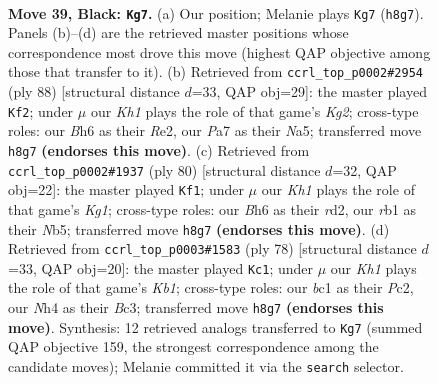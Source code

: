 \documentclass[11pt]{article}
\begin{document}
\clearpage

\begin{figure}[p]\centering
\begin{subfigure}{0.46\textwidth}\centering
\resizebox{\linewidth}{!}{%
\newchessgame
\chessboard[
  setfen={3r3k/p4B2/Pp5b/5p2/4pP1n/8/5K2/1RB5 b - - 11 39},
  showmover=false,
  pgfstyle=straightmove, color=movearrow, markmove={h8-g7}
]}
\caption{}
\end{subfigure}\hfill
\begin{subfigure}{0.46\textwidth}\centering
\resizebox{\linewidth}{!}{%
\newchessgame
\chessboard[
  setfen={8/4k3/4p1p1/N7/6P1/2r2P2/P3R1K1/2b5 w - - 1 45},
  showmover=false,
  pgfstyle=straightmove, color=movearrow, markmove={g2-f2}
]}
\caption{}
\end{subfigure}
\\[4pt]
\begin{subfigure}{0.46\textwidth}\centering
\resizebox{\linewidth}{!}{%
\newchessgame
\chessboard[
  setfen={5k2/6p1/7p/pN1b4/P6P/6P1/3r1P2/R5K1 w - - 0 41},
  showmover=false,
  pgfstyle=straightmove, color=movearrow, markmove={g1-f1}
]}
\caption{}
\end{subfigure}\hfill
\begin{subfigure}{0.46\textwidth}\centering
\resizebox{\linewidth}{!}{%
\newchessgame
\chessboard[
  setfen={1r3b2/5p1k/3p4/5pPp/7P/1PB5/2P5/1K2R3 w - - 2 40},
  showmover=false,
  pgfstyle=straightmove, color=movearrow, markmove={b1-c1}
]}
\caption{}
\end{subfigure}
\caption{\textbf{Move 39, Black: \texttt{Kg7}.} (a) Our position; Melanie plays \texttt{Kg7} (\texttt{h8g7}). Panels (b)--(d) are the retrieved master positions whose correspondence most drove this move (highest QAP objective among those that transfer to it). (b) Retrieved from \texttt{ccrl\_top\_p0002\#2954} (ply 88) [structural distance $d$=33, QAP obj=29]: the master played \texttt{Kf2}; under $\mu$ our \emph{Kh1} plays the role of that game's \emph{Kg2}; cross-type roles: our \emph{B}h6 as their \emph{R}e2, our \emph{P}a7 as their \emph{N}a5; transferred move \texttt{h8g7} \textbf{(endorses this move)}. (c) Retrieved from \texttt{ccrl\_top\_p0002\#1937} (ply 80) [structural distance $d$=32, QAP obj=22]: the master played \texttt{Kf1}; under $\mu$ our \emph{Kh1} plays the role of that game's \emph{Kg1}; cross-type roles: our \emph{B}h6 as their \emph{r}d2, our \emph{r}b1 as their \emph{N}b5; transferred move \texttt{h8g7} \textbf{(endorses this move)}. (d) Retrieved from \texttt{ccrl\_top\_p0003\#1583} (ply 78) [structural distance $d$=33, QAP obj=20]: the master played \texttt{Kc1}; under $\mu$ our \emph{Kh1} plays the role of that game's \emph{Kb1}; cross-type roles: our \emph{b}c1 as their \emph{P}c2, our \emph{N}h4 as their \emph{B}c3; transferred move \texttt{h8g7} \textbf{(endorses this move)}. Synthesis: 12 retrieved analogs transferred to \texttt{Kg7} (summed QAP objective 159, the strongest correspondence among the candidate moves); Melanie committed it via the \texttt{search} selector.}
\label{fig:thought-m77}
\end{figure}
\end{document}
